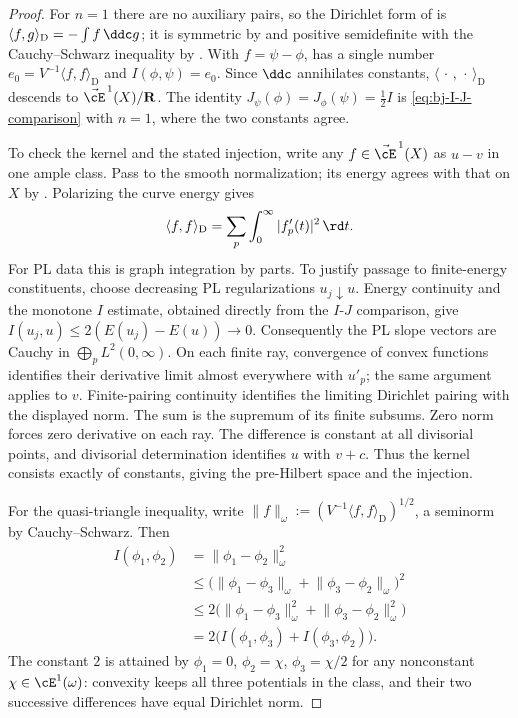 \begin{proof}
For $n=1$ there are no auxiliary pairs, so the Dirichlet form of
 is
$\langle f,g\rangle_{\mathrm D}=-\int f\,\ddc g$; it is symmetric by
 and positive semidefinite with the
Cauchy--Schwarz inequality by .  With
$f=\psi-\phi$,  has a single number
$e_0=V^{-1}\langle f,f\rangle_{\mathrm D}$ and
$I(\phi,\psi)=e_0$.  Since $\ddc$ annihilates constants,
$\langle\,\cdot\,,\,\cdot\,\rangle_{\mathrm D}$ descends to
$\vec\cE^{\,1}(X)/\mathbf R$.  The identity
$J_\psi(\phi)=J_\phi(\psi)=\tfrac12I$ is
\eqref{eq:bj-I-J-comparison} with $n=1$, where the two constants agree.

To check the kernel and the stated injection, write any
$f\in\vec\cE^{\,1}(X)$ as $u-v$ in one ample class. Pass to the
smooth normalization; its energy agrees with that on $X$ by
\cite[Proposition~7.7(iv)]{BJ22}. Polarizing the curve energy gives
\[
 \langle f,f\rangle_{\mathrm D}
       =\sum_{p}\int_0^\infty |f'_p(t)|^2\,\rd t.
\]
For PL data this is graph integration by parts. To justify passage to
finite-energy constituents, choose decreasing PL regularizations
$u_j\downarrow u$. Energy continuity and the monotone $I$ estimate,
obtained directly from the $I$-$J$ comparison, give
$I(u_j,u)\le2(E(u_j)-E(u))\to0$. Consequently the PL slope vectors
are Cauchy in $\bigoplus_p L^2(0,\infty)$. On each finite ray,
convergence of convex functions identifies their derivative limit
almost everywhere with $u'_p$; the same argument applies to $v$.
Finite-pairing continuity \cite[Theorem~7.14]{BJ22} identifies the
limiting Dirichlet pairing with the displayed norm. The sum is the
supremum of its finite subsums. Zero norm forces zero derivative on each ray. The
difference is constant at all divisorial points, and divisorial
determination identifies $u$ with $v+c$. Thus the kernel consists
exactly of constants, giving the pre-Hilbert space and the injection.

For the quasi-triangle inequality, write
$\lVert f\rVert_\omega:=
 (V^{-1}\langle f,f\rangle_{\mathrm D})^{1/2}$, a seminorm by
Cauchy--Schwarz.  Then
\[
 \begin{aligned}
 I(\phi_1,\phi_2)&=\lVert\phi_1-\phi_2\rVert_\omega^2\\
 &\le\bigl(\lVert\phi_1-\phi_3\rVert_\omega
              +\lVert\phi_3-\phi_2\rVert_\omega\bigr)^2\\
 &\le2\bigl(\lVert\phi_1-\phi_3\rVert_\omega^2
              +\lVert\phi_3-\phi_2\rVert_\omega^2\bigr)\\
 &=2\bigl(I(\phi_1,\phi_3)+I(\phi_3,\phi_2)\bigr).
 \end{aligned}
\]
The constant $2$ is attained by $\phi_1=0$, $\phi_2=\chi$,
$\phi_3=\chi/2$ for any nonconstant $\chi\in\cE^1(\omega)$:
convexity keeps all three potentials in the class, and their two
successive differences have equal Dirichlet norm.
\end{proof}

